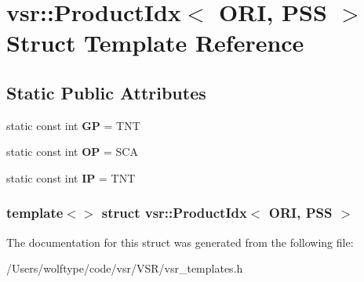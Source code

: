 \hypertarget{structvsr_1_1_product_idx_3_01_o_r_i_00_01_p_s_s_01_4}{\section{vsr\-:\-:Product\-Idx$<$ O\-R\-I, P\-S\-S $>$ Struct Template Reference}
\label{structvsr_1_1_product_idx_3_01_o_r_i_00_01_p_s_s_01_4}
}
\subsection*{Static Public Attributes}
\begin{DoxyCompactItemize}
\item 
\hypertarget{structvsr_1_1_product_idx_3_01_o_r_i_00_01_p_s_s_01_4_af0c9551e39cc43095c9c9105fa933425}{static const int {\bfseries G\-P} = T\-N\-T}\label{structvsr_1_1_product_idx_3_01_o_r_i_00_01_p_s_s_01_4_af0c9551e39cc43095c9c9105fa933425}

\item 
\hypertarget{structvsr_1_1_product_idx_3_01_o_r_i_00_01_p_s_s_01_4_a95d7dc15693efe4b79cebed63d2c3b0e}{static const int {\bfseries O\-P} = S\-C\-A}\label{structvsr_1_1_product_idx_3_01_o_r_i_00_01_p_s_s_01_4_a95d7dc15693efe4b79cebed63d2c3b0e}

\item 
\hypertarget{structvsr_1_1_product_idx_3_01_o_r_i_00_01_p_s_s_01_4_a6589a1599e075ceeace1f5ff67152530}{static const int {\bfseries I\-P} = T\-N\-T}\label{structvsr_1_1_product_idx_3_01_o_r_i_00_01_p_s_s_01_4_a6589a1599e075ceeace1f5ff67152530}

\end{DoxyCompactItemize}
\subsubsection*{template$<$$>$ struct vsr\-::\-Product\-Idx$<$ O\-R\-I, P\-S\-S $>$}



The documentation for this struct was generated from the following file\-:\begin{DoxyCompactItemize}
\item 
/\-Users/wolftype/code/vsr/\-V\-S\-R/vsr\-\_\-templates.\-h\end{DoxyCompactItemize}
